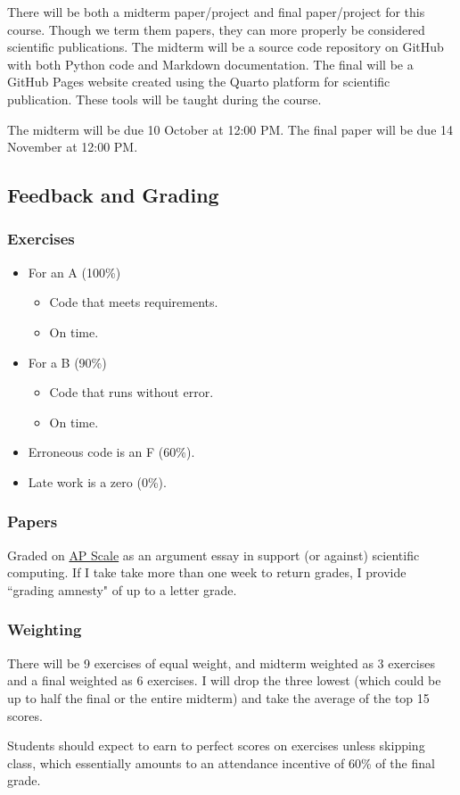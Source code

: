 \documentclass[11pt]{article}
\begin{document}
There will be both a midterm paper/project and final paper/project for this course. Though we term them papers, they can more properly be considered scientific publications. The midterm will be a source code repository on GitHub with both Python code and Markdown documentation. The final will be a GitHub Pages website created using the Quarto platform for scientific publication. These tools will be taught during the course.

The midterm will be due 10 October at 12:00 PM. 
The final paper will be due 14 November at 12:00 PM.


\subsection*{Feedback and Grading}

\subsubsection*{Exercises}

\begin{itemize}
    \item For an A (100\%)
    \begin{itemize}
        \item Code that meets requirements.
        \item On time.
    \end{itemize}
    \item For a B (90\%)
    \begin{itemize}
        \item Code that runs without error.
        \item On time.
    \end{itemize}
    \item Erroneous code is an F (60\%).
    \item Late work is a zero (0\%).
\end{itemize}

\subsubsection*{Papers}

Graded on \href{https://apcentral.collegeboard.org/media/pdf/ap-english-language-and-composition-frqs-1-2-3-scoring-rubrics.pdf}{AP Scale} as an argument essay in support (or against) scientific computing.  If I take take more than one week to return grades, I provide ``grading amnesty" of up to a letter grade.

\subsubsection*{Weighting}

There will be 9 exercises of equal weight, and midterm weighted as 3 exercises and a final weighted as 6 exercises. I will drop the three lowest (which could be up to half the final or the entire midterm) and take the average of the top 15 scores. 

Students should expect to earn to perfect scores on exercises unless skipping class, which essentially amounts to an attendance incentive of 60\% of the final grade.


\end{document}
